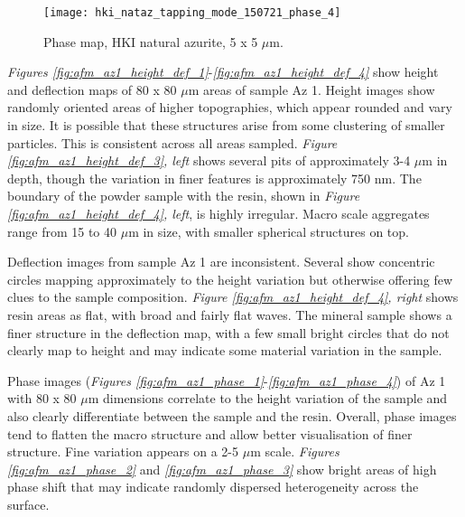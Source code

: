 \begin{figure}[H]
\centering
  \texttt{[image: hki\_nataz\_tapping\_mode\_150721\_phase\_4]}
\caption[Phase map, HKI natural azurite]{Phase map, HKI natural azurite, 5 x 5 $\mu$m.}
\label{fig:afm_hki_nataz_phase_5}
\end{figure}



\textit{Figures \ref{fig:afm_az1_height_def_1}}-\textit{\ref{fig:afm_az1_height_def_4}} show height and deflection maps of 80 x 80 $\mu$m areas of sample Az 1. Height images show randomly oriented areas of higher topographies, which appear rounded and vary in size. It is possible that these structures arise from some clustering of smaller particles. This is consistent across all areas sampled. \textit{Figure \ref{fig:afm_az1_height_def_3}, left} shows several pits of approximately 3-4 $\mu$m in depth, though the variation in finer features is approximately 750 nm. The boundary of the powder sample with the resin, shown in \textit{Figure \ref{fig:afm_az1_height_def_4}, left}, is highly irregular. Macro scale aggregates range from 15 to 40 $\mu$m in size, with smaller spherical structures on top.

Deflection images from sample Az 1 are inconsistent. Several show concentric circles mapping approximately to the height variation but otherwise offering few clues to the sample composition. \textit{Figure \ref{fig:afm_az1_height_def_4}, right} shows resin areas as flat, with broad and fairly flat waves. The mineral sample shows a finer structure in the deflection map, with a few small bright circles that do not clearly map to height and may indicate some material variation in the sample.

Phase images (\textit{Figures \ref{fig:afm_az1_phase_1}}-\textit{\ref{fig:afm_az1_phase_4}}) of Az 1 with 80 x 80 $\mu$m dimensions correlate to the height variation of the sample and also clearly differentiate between the sample and the resin. Overall, phase images tend to flatten the macro structure and allow better visualisation of finer structure. Fine variation appears on a 2-5 $\mu$m scale. \textit{Figures \ref{fig:afm_az1_phase_2}} and \textit{\ref{fig:afm_az1_phase_3}} show bright areas of high phase shift that may indicate randomly dispersed heterogeneity across the surface.  

